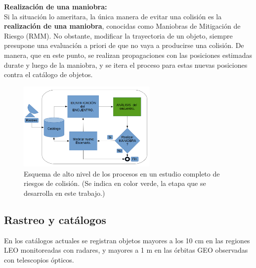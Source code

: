 {\bf{Realizaci\'on de una maniobra:}}\\
Si la situaci\'on lo ameritara, la \'unica manera de evitar una colisi\'on es la {\bf{realizaci\'on de una maniobra}}, conocidas como Maniobras de Mitigaci\'on de Riesgo (RMM). No obstante, modificar la trayectoria de un objeto, siempre presupone una evaluaci\'on a priori de que no vaya a producirse una colisi\'on. De manera, que en este punto, se realizan propagaciones con las posiciones estimadas durate y luego de la maniobra, y se itera el proceso para estas nuevas posiciones contra el cat\'alogo de objetos.\\ 



\begin{figure}[!h]
  \centering
  \includegraphics[width=0.6\textwidth]{imagenes/estudiocolision}
  \caption[Estudio de Colisi\'on]{Esquema de alto nivel de los procesos en un estudio completo de riesgos de colisi\'on. (Se indica en color verde, la etapa que se desarrolla en este trabajo.)}
  \label{fig:estudiocolision}
\end{figure}



\subsection*{Rastreo y cat\'alogos}\label{subsec:redes}

En los catálogos actuales se registran objetos mayores a los 10 cm en las regiones LEO monitoreadas con radares, y mayores a 1 m en las órbitas GEO observadas con telescopios ópticos.\\
 
